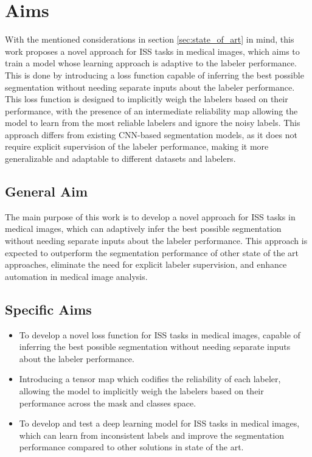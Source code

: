 
\section{Aims}\label{sec:objectives}

With the mentioned considerations in section \ref{sec:state_of_art}
in mind, this work proposes a novel approach for \gls{ISS} tasks in
medical images, which aims to train a model whose learning approach
is adaptive to the labeler performance. This is done by introducing a
loss function capable of inferring the best possible segmentation
without needing separate inputs about the labeler performance. This
loss function is designed to implicitly weigh the labelers based on
their performance, with the presence of an intermediate reliability
map allowing the model to learn from the most reliable labelers and
ignore the noisy labels. This approach differs from existing
\gls{CNN}-based segmentation models, as it does not require explicit
supervision of the labeler performance, making it more generalizable
and adaptable to different datasets and labelers.
\subsection{General Aim}

The main purpose of this work is to develop a novel approach for
\gls{ISS} tasks in medical images, which can adaptively infer the best
possible segmentation without needing separate inputs about the
labeler performance. This approach is expected to outperform the
segmentation performance of other state of the art approaches,
eliminate the need for explicit labeler supervision, and enhance
automation in medical image analysis.

\subsection{Specific Aims}

\begin{itemize}

  \item To develop a novel loss function for \gls{ISS} tasks in
    medical images, capable of inferring the best possible
    segmentation without needing separate inputs about the labeler
    performance.

  \item Introducing a tensor map which codifies the reliability of
    each labeler, allowing the model to implicitly weigh the labelers
    based on their performance across the mask and classes space.

  \item To develop and test a deep learning model for \gls{ISS} tasks
    in medical images, which can learn from inconsistent labels and
    improve the segmentation performance compared to other solutions
    in state of the art.

\end{itemize}
